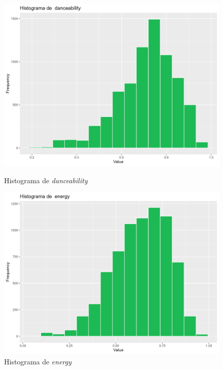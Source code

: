\begin{figure}[H]
\centering
    \begin{minipage}{.4\textwidth}
        \centering
        \includegraphics[width=0.95\linewidth]{Images/2_Univariate/hist_danceability.png}
        \caption{Histograma de \textit{danceability}}
        \label{fig:UnivariateR_danceability}
    \end{minipage}%
    \begin{minipage}{.4\textwidth}
        \centering
        \includegraphics[width=0.95\linewidth]{Images/2_Univariate/hist_energy.png}
        \caption{Histograma de \textit{energy}}
        \label{fig:UnivariateR_energy}
    \end{minipage}%
\end{figure}


